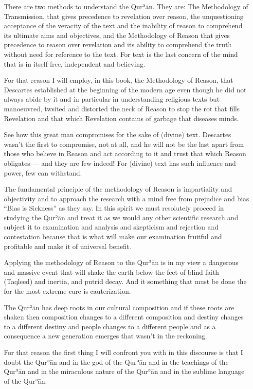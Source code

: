 \documentclass[12pt]{book}
\def \Quran{Qurʾān} %
\def \Qrn{\Quran}   %
\begin{document}
There are two methods to understand the \Quran. They are: The Methodology of
Transmission, that gives precedence to revelation over reason, the
unquestioning acceptance of the veracity of the text and the inability of
reason to comprehend its ultimate aims and objectives, and the Methodology of
Reason that gives precedence to reason over revelation and its ability to
comprehend the truth without need for reference to the text. For text is the
last concern of the mind that is in itself free, independent and believing.

For that reason I will employ, in this book, the Methodology of Reason, that
Descartes established at the beginning of the modern age even though he did not
always abide by it and in particular in understanding religious texts but
manoeuvred, twsited and distorted the neck of Reason to stop the rot that fills
Revelation and that which Revelation contains of garbage that diseases minds.

See how this great man compromises for the sake of (divine) text. Descartes
wasn’t the first to compromise, not at all, and he will not be the last apart
from those who believe in Reason and act according to it and trust that which
Reason obligates — and they are few indeed! For (divine) text has such
influence and power, few can withstand.

The fundamental principle of the methodology of Reason is impartiality and
objectivity and to approach the research with a mind free from prejudice and
bias “Bias is Sickness” as they say. In this spirit we must resolutely proceed
in studying the \Qrn{} and treat it as we would any other scientific research
and subject it to examination and analysis and skepticism and rejection and
contestation because that is what will make our examination fruitful and
profitable and make it of universal benefit.

Applying the methodology of Reason to the \Qrn{} is in my view a dangerous and
massive event that will shake the earth below the feet of blind faith (Taqleed)
and inertia, and putrid decay. And it something that must be done the for the
most extreme cure is cauterization.

The \Qrn{} has deep roots in our cultural composition and if these roots are
shaken then composition changes to a different composition and destiny changes
to a different destiny and people changes to a different people and as a
consequence a new generation emerges that wasn’t in the reckoning.

For that reason the first thing I will confront you with in this discourse is
that I doubt the \Qrn{} and in the god of the \Qrn{} and in the teachings of
the \Qrn{} and in the miraculous nature of the \Qrn{} and in the sublime
language of the \Quran.
\end{document}
